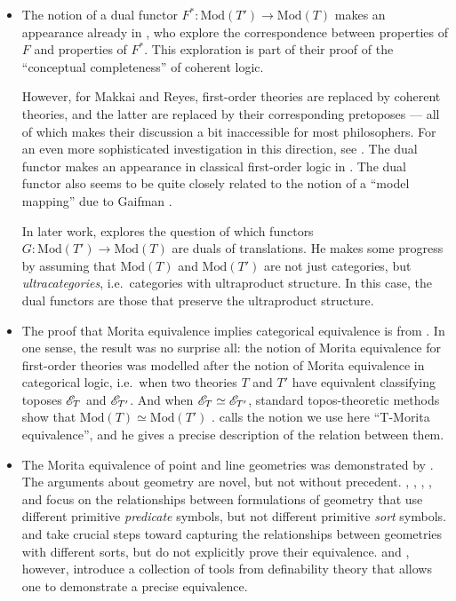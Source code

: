 \begin{itemize}
\item The notion of a dual functor
  $F^*:\mathrm{Mod}(T')\to \mathrm{Mod}(T)$ makes an appearance
  already in \cite{makkai}, who explore the correspondence between
  properties of $F$ and properties of $F^*$.  This exploration is part
  of their proof of the ``conceptual completeness'' of coherent logic.

  However, for Makkai and Reyes, first-order theories are replaced by
  coherent theories, and the latter are replaced by their
  corresponding pretoposes --- all of which makes their discussion a
  bit inaccessible for most philosophers.  For an even more
  sophisticated investigation in this direction, see \cite{breiner}.
  The dual functor makes an appearance in classical first-order logic
  in \cite{gajda1987}.  The dual functor also seems to be quite
  closely related to the notion of a ``model mapping'' due to Gaifman
  \citep[see][]{myers}.

  In later work, \cite{makkai-duality} explores the question of which
  functors $G:\mathrm{Mod}(T')\to \mathrm{Mod}(T)$ are duals of
  translations.  He makes some progress by assuming that
  $\mathrm{Mod}(T)$ and $\mathrm{Mod}(T')$ are not just categories,
  but {\it ultracategories}, i.e.\ categories with ultraproduct
  structure.  In this case, the dual functors are those that preserve
  the ultraproduct structure.

\item The proof that Morita equivalence implies categorical
  equivalence is from \cite{barrett2015a}.  In one sense, the result
  was no surprise all: the notion of Morita equivalence for
  first-order theories was modelled after the notion of Morita
  equivalence in categorical logic, i.e.\ when two theories $T$ and
  $T'$ have equivalent classifying toposes $\mathscr E _T$ and $\mathscr E _{T'}$.
  And when $\mathscr E _T\simeq \mathscr E _{T'}$, standard topos-theoretic methods
  show that $\mathrm{Mod}(T)\simeq \mathrm{Mod}(T')$
  \citep[see][D1.4.13]{johnstone}.  \cite{tsementzis} calls the notion
  we use here ``T-Morita equivalence'', and he gives a precise
  description of the relation between them.

\item The Morita equivalence of point and line geometries was
  demonstrated by \cite{barrett2016a}.  The arguments about geometry
  are novel, but not without precedent.  \cite{beth1956},
  \cite{scott1956}, \cite{tarski1956}, \cite{robinson1959}, and
  \cite{royden1959} focus on the relationships between formulations of
  geometry that use different primitive \textit{predicate} symbols,
  but not different primitive \textit{sort}
  symbols. \cite{szczerba1977} and \cite{schwabhauser1983} take
  crucial steps toward capturing the relationships between geometries
  with different sorts, but do not explicitly prove their equivalence.
  \cite{andreka2008} and \cite{andreka2014}, however, introduce a
  collection of tools from definability theory that allows one to
  demonstrate a precise equivalence.


\end{itemize}
